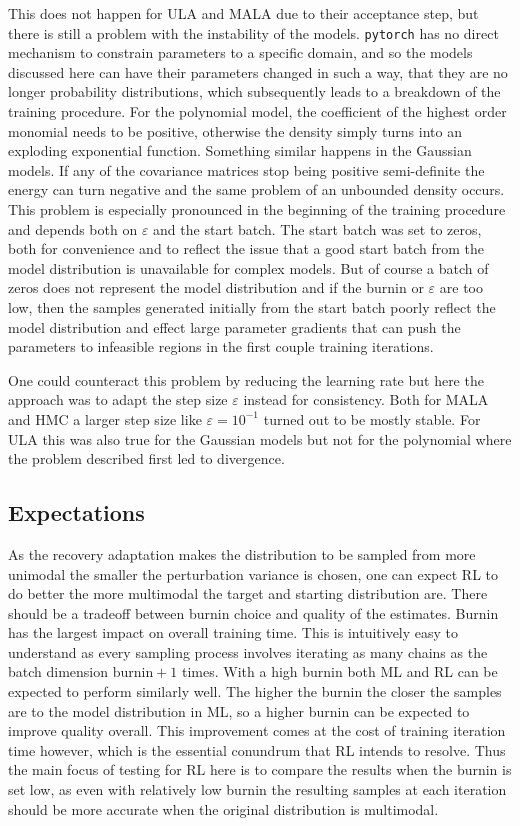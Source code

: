This does not happen for ULA and MALA due to their acceptance step, but there is still a problem with the instability of the models.
\texttt{pytorch} has no direct mechanism to constrain parameters to a specific domain, and so the models discussed here can have their parameters changed in such a way,
that they are no longer probability distributions, which subsequently leads to a breakdown of the training procedure.
For the polynomial model, the coefficient of the highest order monomial needs to be positive, otherwise the density simply turns into an exploding exponential function.
Something similar happens in the Gaussian models.
If any of the covariance matrices stop being positive semi-definite the energy can turn negative and the same problem of an unbounded density occurs.
This problem is especially pronounced in the beginning of the training procedure and depends both on $\varepsilon$ and the start batch.
The start batch was set to zeros, both for convenience and to reflect the issue that a good start batch from the model distribution is unavailable for complex models.
But of course a batch of zeros does not represent the model distribution and if the burnin or $\varepsilon$ are too low,
then the samples generated initially from the start batch poorly reflect the model distribution and 
effect large parameter gradients that can push the parameters to infeasible regions in the first couple training iterations.

One could counteract this problem by reducing the learning rate but here the approach was to adapt the step size $\varepsilon$ instead for consistency.
Both for MALA and HMC a larger step size like $\varepsilon = 10^{-1}$ turned out to be mostly stable.
For ULA this was also true for the Gaussian models but not for the polynomial where the problem described first led to divergence.

\subsection{Expectations}
As the recovery adaptation makes the distribution to be sampled from more unimodal the smaller the perturbation variance is chosen,
one can expect RL to do better the more multimodal the target and starting distribution are.
There should be a tradeoff between burnin choice and quality of the estimates.
Burnin has the largest impact on overall training time.
This is intuitively easy to understand as every sampling process involves iterating as many chains as the batch dimension $\text{burnin} +1$ times.
With a high burnin both ML and RL can be expected to perform similarly well.
The higher the burnin the closer the samples are to the model distribution in ML, so a higher burnin can be expected to improve quality overall.
This improvement comes at the cost of training iteration time however, which is the essential conundrum that RL intends to resolve.
Thus the main focus of testing for RL here is to compare the results when the burnin is set low, 
as even with relatively low burnin the resulting samples at each iteration should be more accurate when the original distribution is multimodal.

